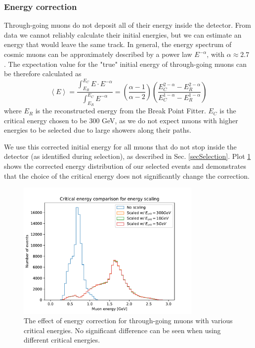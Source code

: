 \documentclass[12pt]{article}
\begin{document}
\subsubsection{Energy correction}
Through-going muons do not deposit all of their energy inside the detector. From data we cannot reliably calculate their initial energies, but we can estimate an energy that would leave the same track. In general, the energy spectrum of cosmic muons can be approximately described by a power law $E^{-\alpha}$, with $\alpha\approx2.7$ \cite{NOVA-doc-51327-v3,rpp2022-rev-cosmic-rays.pdf}. The expectation value for the "true" initial energy of through-going muons can be therefore calculated as
\begin{equation}
\left\langle E\right\rangle =\frac{\int^{E_C}_{E_R} E\cdot E^{-\alpha}}{\int^{E_C}_{E_R} E^{-\alpha}}=\left(\frac{\alpha -1}{\alpha -2}\right)\left(\frac{E_C^{2-\alpha}-E_R^{2-\alpha}}{E_C^{1-\alpha}-E_R^{1-\alpha}}\right)
\end{equation}
where $E_R$ is the reconstructed energy from the Break Point Fitter. $E_C$ is the critical energy chosen to be 300 GeV, as we do not expect muons with higher energies to be selected due to large showers along their paths.

We use this corrected initial energy for all muons that do not stop inside the detector (as identified during selection), as described in Sec. \ref{secSelection}. Plot \ref{figEnergyScaling} shows the corrected energy distribution of our selected events and demonstrates that the choice of the critical energy does not significantly change the correction. 

\begin{figure}[hbtp]
\centering
\includegraphics[width=0.8\textwidth]{ECritComparison.pdf}
\caption{The effect of energy correction for through-going muons with various critical energies. No significant difference can be seen when using different critical energies.}
\label{figEnergyScaling}
\end{figure}
\end{document}
